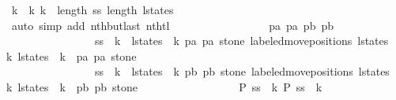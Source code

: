 \begin{isabellebody}
\ {\isacharbackquoteopen}k{}\ {\isacharless}\ k{}{\isacharbackquoteclose}\ {\isacharbackquoteopen}k{}\ {\isacharless}\ length\ {\isacharquery}ss{\isacharbackquoteclose}\ {\isacharbackquoteopen}length\ l{\isacharunderscore}states\ {\isasymge}\ {}{\isacharbackquoteclose}\isanewline
\ \ \ \ \ \ \ \ \ \ \ \ \ \ \ \ \isamarkupfalse%
\ {\isacharparenleft}auto\ simp\ add{\isacharcolon}\ nth{\isacharunderscore}butlast\ nth{\isacharunderscore}tl{\isacharparenright}\isanewline
\ \ \ \ \ \ \ \ \ \ \ \ \ \ \isamarkupfalse%
\ \isamarkupfalse%
\ p{}a\ p{}a\ p{}b\ p{}b\ \isanewline
\ \ \ \ \ \ \ \ \ \ \ \ \ \ \ \ {\isachardoublequoteopen}{\isacharquery}ss\ {\isacharbang}\ k{}\ {\isacharequal}\ {\isacharparenleft}l{\isacharunderscore}states\ {\isacharbang}\ k{}{\isacharcomma}\ p{}a{\isacharcomma}\ p{}a{\isacharcomma}\ stone{\isacharparenright}{\isachardoublequoteclose}\ {\isachardoublequoteopen}labeled{\isacharunderscore}move{\isacharunderscore}positions\ {\isacharparenleft}l{\isacharunderscore}states\ {\isacharbang}\ k{}{\isacharparenright}\ {\isacharparenleft}l{\isacharunderscore}states\ {\isacharbang}\ {\isacharparenleft}k{}{\isacharplus}{}{\isacharparenright}{\isacharparenright}\ {\isacharequal}\ {\isacharparenleft}p{}a{\isacharcomma}\ p{}a{\isacharcomma}\ stone{\isacharparenright}{\isachardoublequoteclose}\isanewline
\ \ \ \ \ \ \ \ \ \ \ \ \ \ \ \ {\isachardoublequoteopen}{\isacharquery}ss\ {\isacharbang}\ k{}\ {\isacharequal}\ {\isacharparenleft}l{\isacharunderscore}states\ {\isacharbang}\ k{}{\isacharcomma}\ p{}b{\isacharcomma}\ p{}b{\isacharcomma}\ stone{\isacharparenright}{\isachardoublequoteclose}\ {\isachardoublequoteopen}labeled{\isacharunderscore}move{\isacharunderscore}positions\ {\isacharparenleft}l{\isacharunderscore}states\ {\isacharbang}\ k{}{\isacharparenright}\ {\isacharparenleft}l{\isacharunderscore}states\ {\isacharbang}\ {\isacharparenleft}k{}{\isacharplus}{}{\isacharparenright}{\isacharparenright}\ {\isacharequal}\ {\isacharparenleft}p{}b{\isacharcomma}\ p{}b{\isacharcomma}\ stone{\isacharparenright}{\isachardoublequoteclose}\isanewline
\ \ \ \ \ \ \ \ \ \ \ \ \ \ \ \ \isamarkupfalse%
\ {\isacharbackquoteopen}{\isacharquery}P\ {\isacharparenleft}{\isacharquery}ss\ {\isacharbang}\ k{}{\isacharparenright}{\isacharbackquoteclose}\ {\isacharbackquoteopen}{\isacharquery}P\ {\isacharparenleft}{\isacharquery}ss\ {\isacharbang}\ k{}{\isacharparenright}{\isacharbackquoteclose}\isanewline

\end{isabellebody}
